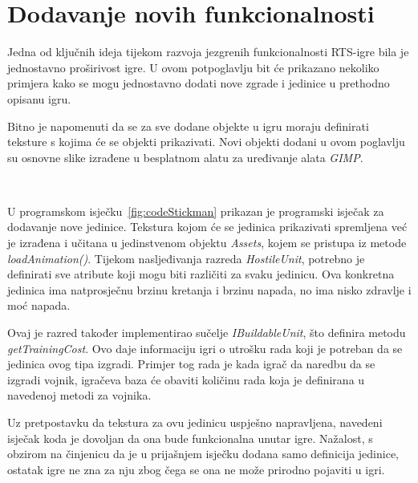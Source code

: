 \documentclass[times, utf8, zavrsni, numeric]{fer}
\begin{document}
\section{Dodavanje novih funkcionalnosti}

\par Jedna od ključnih ideja tijekom razvoja jezgrenih funkcionalnosti RTS-igre bila je jednostavno proširivost igre.
U ovom potpoglavlju bit će prikazano nekoliko primjera kako se mogu jednostavno dodati nove zgrade i jedinice u prethodno opisanu igru.

\par Bitno je napomenuti da se za sve dodane objekte u igru moraju definirati teksture s kojima će se objekti prikazivati.
Novi objekti dodani u ovom poglavlju su osnovne slike izrađene u besplatnom alatu za uređivanje alata \textit{GIMP}.

\vspace{3mm}
\begin{minipage}{\textwidth}
	
\end{minipage}\

\par U programskom isječku~\ref{fig:codeStickman} prikazan je programski isječak za dodavanje nove jedinice.
Tekstura kojom će se jedinica prikazivati spremljena već je izrađena i učitana u jedinstvenom objektu \textit{Assets}, kojem se pristupa iz metode \textit{loadAnimation()}.
Tijekom nasljeđivanja razreda \textit{HostileUnit}, potrebno je definirati sve atribute koji mogu biti različiti za svaku jedinicu.
Ova konkretna jedinica ima natprosječnu brzinu kretanja i brzinu napada, no ima nisko zdravlje i moć napada.

\par Ovaj je razred također implementirao sučelje \textit{IBuildableUnit}, što definira metodu \textit{getTrainingCost}.
Ovo daje informaciju igri o utrošku rada koji je potreban da se jedinica ovog tipa izgradi.
Primjer tog rada je kada igrač da naredbu da se izgradi vojnik, igračeva baza će obaviti količinu rada koja je definirana u navedenoj metodi za vojnika.

\par Uz pretpostavku da tekstura za ovu jedinicu uspješno napravljena, navedeni isječak koda je dovoljan da ona bude funkcionalna unutar igre.
Nažalost, s obzirom na činjenicu da je u prijašnjem isječku dodana samo definicija jedinice, ostatak igre ne zna za nju zbog čega se ona ne može prirodno pojaviti u igri.
\end{document}

